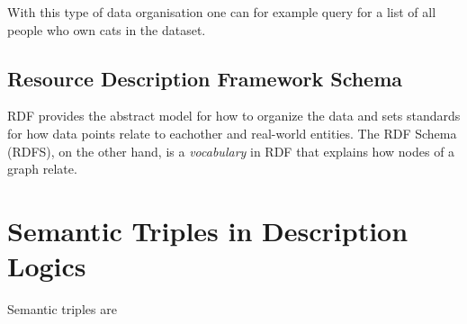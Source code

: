 With this type of data organisation one can for example query for a list of all people who own cats in the dataset.

\subsection{Resource Description Framework Schema}
RDF provides the abstract model for how to organize the data and sets standards for how data points relate to eachother and real-world entities. The RDF Schema (RDFS), on the other hand, is a \emph{vocabulary} in RDF that explains how nodes of a graph relate.

\section{Semantic Triples in Description Logics}
Semantic triples are 
\fi
